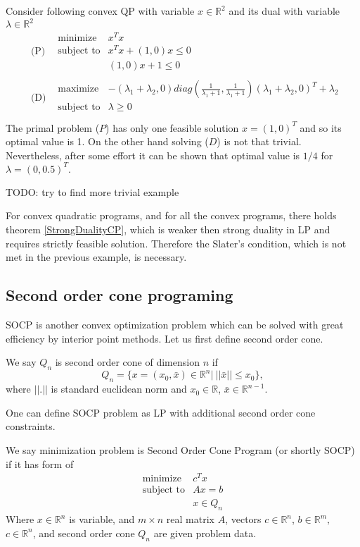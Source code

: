 \documentclass[10pt,oneside]{book}
\theoremstyle{definition}
\begin{document}
\ex  Consider following convex QP with variable $x\in \mathbb{R}^2$ and its dual with variable $\lambda\in\mathbb{R}^2$
\begin{eqnarray}
&\mbox{(P)}&\begin{array}{ll}
\mbox{minimize} & x^Tx \\
\mbox{subject to}&  x^Tx + (1,0)x \leq 0\\
& (1,0)x+1\leq 0
\end{array} \\
&\mbox{(D)}&\begin{array}{ll}
\mbox{maximize} & -(\lambda_1 + \lambda_2,0)
diag(\frac{1}{\lambda_1 + 1}, \frac{1}{\lambda_1 + 1}) (\lambda_1 + \lambda_2,0)^T + \lambda_2 \\
\mbox{subject to}&  \lambda \geq 0\\
\end{array} 
\end{eqnarray}
The primal problem ($P$) has only one feasible solution $x = (1,0)^T$ and so its optimal value is 1.
On the other hand solving ($D$) is not that trivial. Nevertheless, after some effort it can be shown that optimal value is $1/4$ for $\lambda = (0,0.5)^T.$

TODO: try to find more trivial example

For convex quadratic programs, and for all the convex programs, there holds  theorem \ref{StrongDualityCP}, which is weaker then strong duality in LP and requires strictly feasible solution. Therefore the Slater's condition, which is not met in the previous example, is necessary. 

\subsection{Second order cone programing}
\label{SectionSOCP}


SOCP is another convex optimization problem which can be solved with great efficiency by interior point methods. Let us first define second order cone.

\label{defSOC} We say $Q_n$ is second order cone of dimension $n$ if 
$$Q_n=\{x = (x_0,\bar{x}) \in \mathbb{R}^n|\ ||\bar{x}||\leq x_0\},$$
where $||.|| $ is standard euclidean norm and $x_0\in \mathbb{R}$, $\bar{x}\in \mathbb{R}^{n-1}$.

One can define SOCP problem as LP with additional second order cone constraints.

\label{defSOCP}
We say minimization problem is Second Order Cone Program (or shortly SOCP) if it has form of
\begin{equation}
\label{socp} 
\begin{array}{ll}
\mbox{minimize} & c^Tx\\
\mbox{subject to}& Ax = b\\
& x \in Q_n
\end{array} 
\tag{SOCP}
\end{equation}
Where $x\in \mathbb{R}^n$ is variable, and $m\times n$ real matrix $A$, vectors $c\in \mathbb{R}^n$, $b\in \mathbb{R}^{m},$ $c\in \mathbb{R}^n$, and second order cone $Q_n$ are given problem data.
\end{document}

